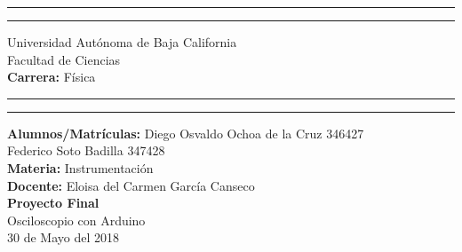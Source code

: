\documentclass{article}
\begin{document}
\begin{titlepage}
\centering
\vfill
\rule{\textwidth}{1.6pt}\vspace{-\baselineskip}\vspace{0.1pt}
\rule{\textwidth}{0.4pt}
{\LARGE Universidad Autónoma de Baja California\\
Facultad de Ciencias\\
\textbf{Carrera:} Física\\
\rule{\textwidth}{0.4pt}\vspace{-\baselineskip}\vspace{10pt}
\rule{\textwidth}{1.6pt}
\textbf{Alumnos/Matrículas:} Diego Osvaldo Ochoa de la Cruz 346427\\
Federico Soto Badilla 347428\\
\textbf{Materia:} Instrumentación\\
\textbf{Docente:} Eloisa del Carmen García Canseco\\
\textbf{Proyecto Final}\\
Osciloscopio con Arduino\\
30 de Mayo del 2018\\}
\vfill


\end{titlepage}
\end{document}
